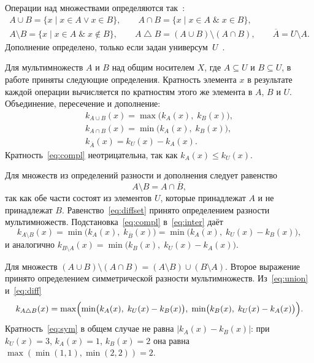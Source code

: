 \documentclass[14pt,a4paper]{extarticle}
\newcommand{\kA}{k_A(x)}
\newcommand{\kB}{k_B(x)}
\newcommand{\kU}{k_U(x)}
\begin{document}
Операции над множествами определяются так~\cite{novikov}:
\begin{gather*}
A \cup B = \{x \mid x \in A \lor x \in B\}, \qquad A \cap B = \{x \mid x \in A \;\&\; x \in B\}, \\
A \setminus B = \{x \mid x \in A \;\&\; x \notin B\}, \qquad A \mathbin{\triangle} B = (A \cup B) \setminus (A \cap B), \qquad \overline{A} = U \setminus A .
\end{gather*}
Дополнение определено, только если задан универсум~$U$~\cite{novikov}.

Для мультимножеств $A$ и $B$ над общим носителем $X$, где $A \subseteq U$ и $B \subseteq U$, в работе приняты следующие определения. Кратность элемента $x$ в результате каждой операции вычисляется по кратностям этого же элемента в $A$, $B$ и $U$. Объединение, пересечение и дополнение:
\begin{gather}
k_{A \cup B}(x) = \max\bigl(\kA,\; \kB\bigr), \label{eq:union}\\
k_{A \cap B}(x) = \min\bigl(\kA,\; \kB\bigr), \label{eq:inter}\\
k_{\overline{A}}(x) = \kU - \kA . \label{eq:compl}
\end{gather}
Кратность~\eqref{eq:compl} неотрицательна, так как $\kA \leqslant \kU$.

Для множеств из определений разности и дополнения следует \mbox{равенство}
\begin{equation}\label{eq:diffset}
A \setminus B = A \cap \overline{B},
\end{equation}
так как обе части состоят из элементов $U$, которые принадлежат $A$ и не принадлежат $B$. Равенство~\eqref{eq:diffset} принято определением разности мультимножеств. Подстановка~\eqref{eq:compl} в~\eqref{eq:inter} даёт
\begin{equation}\label{eq:diff}
k_{A \setminus B}(x) = \min\bigl(\kA,\; k_{\overline{B}}(x)\bigr) = \min\bigl(\kA,\; \kU - \kB\bigr),
\end{equation}
и аналогично $k_{B \setminus A}(x) = \min\bigl(\kB,\; \kU - \kA\bigr)$.

Для множеств $(A \cup B) \setminus (A \cap B) = (A \setminus B) \cup (B \setminus A)$. Второе выражение принято определением симметрической разности мультимножеств. Из~\eqref{eq:union} и~\eqref{eq:diff}
\begin{equation}\label{eq:sym}
k_{A \triangle B}(x) = \max\Bigl(\min\bigl(\kA,\; \kU - \kB\bigr),\; \min\bigl(\kB,\; \kU - \kA\bigr)\Bigr).
\end{equation}
Кратность~\eqref{eq:sym} в общем случае не равна $|\kA - \kB|$: при $\kU = 3$, $\kA = 1$, $\kB = 2$ она равна $\max(\min(1, 1), \min(2, 2)) = 2$.
\end{document}
